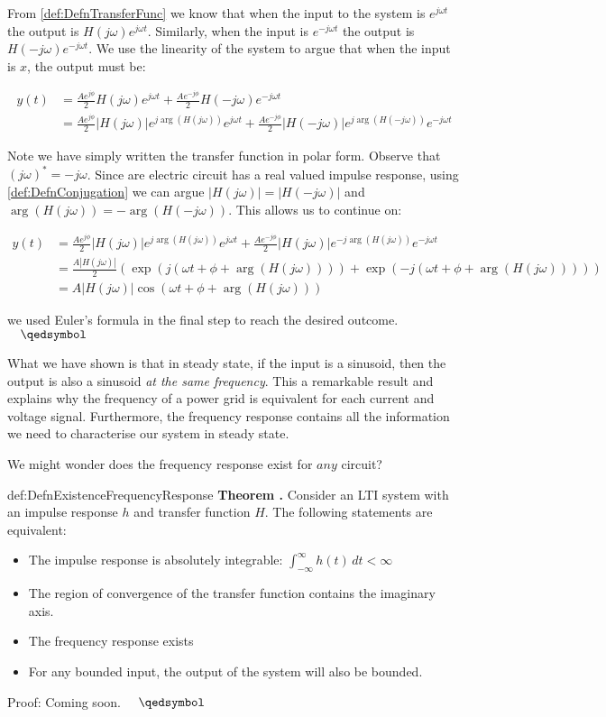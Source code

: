 \documentclass[14pt,a5paper,twoside]{book}
\newenvironment{myTheorem}[2]{ \begin{Theorem}[adjusted title=#1]{}{#2} 
  \textbf{Theorem \thetcbcounter.} \label{#2}}{\end{Theorem}}
\begin{document}
From \ref{def:DefnTransferFunc} we know that when the input to the system is $e^{j\omega t}$ the output is $H(j\omega)e^{j\omega t}$. Similarly, when the input is $e^{-j\omega t}$ the output is $H(-j\omega)e^{-j\omega t}$. We use the linearity of the system to argue that when the input is $x$, the output must be:

\begin{align*}
y(t) &= \frac{Ae^{j\phi}}{2}H(j\omega)e^{j\omega t} + \frac{Ae^{-j\phi}}{2}H(-j\omega)e^{-j\omega t} \\
&= \frac{Ae^{j\phi}}{2}|H(j\omega)|e^{j\arg(H(j\omega))}e^{j\omega t} + \frac{Ae^{-j\phi}}{2}|H(-j\omega)|e^{j\arg(H(-j\omega))}e^{-j\omega t} 
\end{align*}

Note we have simply written the transfer function in polar form. Observe that $(j\omega)^* = -j\omega$. Since are electric circuit has a real valued impulse response, using \ref{def:DefnConjugation} we can argue $|H(j\omega)| = |H(-j\omega)|$ and $\arg(H(j\omega)) = -\arg(H(-j\omega))$. This allows us to continue on:

\begin{align*}
y(t) &= \frac{Ae^{j\phi}}{2}|H(j\omega)|e^{j\arg(H(j\omega))}e^{j\omega t} + \frac{Ae^{-j\phi}}{2}|H(j\omega)|e^{-j\arg(H(j\omega))}e^{-j\omega t} \\
&= \frac{A|H(j\omega)|}{2} \left( \exp(j(\omega t + \phi + \arg(H(j\omega)))) + \exp(-j(\omega t + \phi + \arg(H(j\omega)))) \right) \\
&=  A |H(j\omega)| \cos\left(\omega t + \phi + \arg(H(j\omega))\right)
\end{align*}

we used Euler's formula in the final step to reach the desired outcome.$\quad\qedsymbol$

What we have shown is that in steady state, if the input is a sinusoid, then the output is also a sinusoid \emph{at the same frequency}. This a remarkable result and explains why the frequency of a power grid is equivalent for each current and voltage signal. Furthermore, the frequency response contains all the information we need to characterise our system in steady state.

We might wonder does the frequency response exist for $any$ circuit?

\begin{myTheorem}{Existense of Frequency Response}{def:DefnExistenceFrequencyResponse}
Consider an LTI system with an impulse response $h$ and transfer function $H$. The following statements are equivalent:
\begin{itemize}
\item{The impulse response is absolutely integrable: $\int_{-\infty}^{\infty} h(t)\,dt<\infty$}
\item{The region of convergence of the transfer function contains the imaginary axis.}
\item{The frequency response exists}
\item{For any bounded input, the output of the system will also be bounded.}
\end{itemize}
\end{myTheorem}
Proof: Coming soon. $\quad\qedsymbol$
\end{document}
